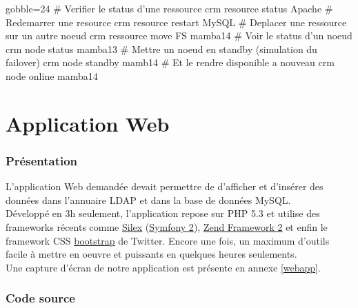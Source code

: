 \documentclass[11pt,a4paper]{report}
\begin{document}
                    \begin{bashcode*}{gobble=24}
                        # Verifier le status d'une ressource
                        crm resource status Apache
                        # Redemarrer une resource
                        crm resource restart MySQL
                        # Deplacer une ressource sur un autre noeud
                        crm ressource move FS mamba14
                        # Voir le status d'un noeud
                        crm node status mamba13
                        # Mettre un noeud en standby (simulation du failover)
                        crm node standby mamb14
                        # Et le rendre disponible a nouveau
                        crm node online mamba14
                    \end{bashcode*}
                    
    \part{Application Web}
        
        \section{Pr\'esentation}
            
            L'application Web demand\'ee devait permettre de d'afficher et d'ins\'erer des donn\'ees dans l'annuaire LDAP et dans la base de donn\'ees MySQL.\\
            
            D\'evelopp\'e en 3h seulement, l'application repose sur PHP 5.3 et utilise des frameworks r\'ecents comme \underline{\href{http://silex.sensiolabs.org}{Silex}} (\underline{\href{http://symfony.com}{Symfony 2}}), \underline{\href{http://framework.zend.com}{Zend Framework 2}} et enfin le framework CSS \underline{\href{http://twitter.github.com/bootstrap}{bootstrap}} de Twitter. Encore une fois, un maximum d'outils facile \`a mettre en oeuvre et puissants en quelques heures seulements.\\
            
            Une capture d'\'ecran de notre application est pr\'esente en annexe \underline{\no\ref{webapp}}.
            
        \section{Code source}
            
\end{document}
